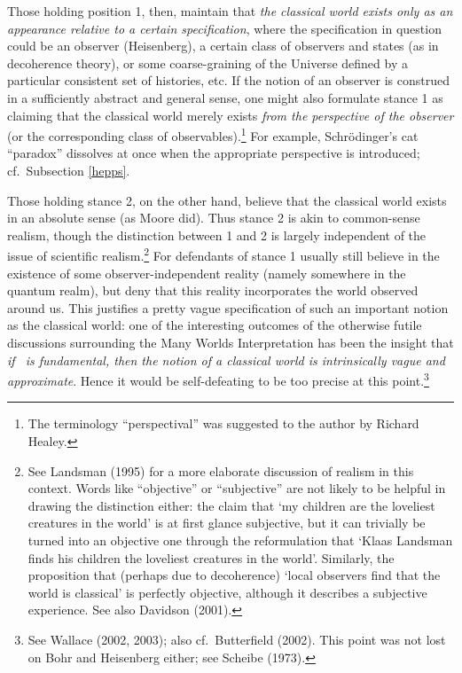 \documentclass[12pt]{article}
\begin{document}
Those holding position 1, then, maintain that {\it the classical world exists only
as an appearance relative to a certain specification}, where the specification in question could be an observer (Heisenberg), a certain class of observers and states (as in decoherence theory), or some  coarse-graining of the Universe defined by a particular consistent set of histories, etc. If the notion of an observer  is construed in a sufficiently abstract and general sense, one might also 
formulate stance 1 as claiming that the classical world merely exists  {\it from the perspective of the observer} (or the corresponding class of observables).\footnote{The  terminology ``perspectival'' was suggested to the author by Richard Healey.}  For example,
 Schr\"{o}dinger's cat ``paradox'' dissolves at once when the appropriate perspective is introduced; cf.\ Subsection \ref{hepps}. 
 
Those holding stance 2, on the other hand,  believe that the classical world exists in an absolute sense (as Moore did). Thus stance 2 is akin to common-sense realism, though the distinction between 1 and 2 is largely independent of the issue of scientific realism.\footnote{See  Landsman (1995) for a more elaborate discussion of 
realism in this context.  Words like ``objective'' or ``subjective'' are not likely to be helpful in drawing the distinction either: the claim that `my children are the loveliest creatures in the world' is at first glance subjective, but it can trivially be turned into an objective one through the reformulation that `Klaas Landsman finds his  children the loveliest creatures in the world'. Similarly, the proposition that 
(perhaps due to decoherence)  `local observers find that the world is classical' is perfectly objective, although it describes a subjective experience. See also Davidson (2001). }
For  defendants of stance 1 usually still believe in the existence of some observer-independent reality (namely somewhere in the quantum realm), but deny that this reality incorporates the world observed around us.  This justifies a pretty vague specification of such an important notion as the classical world: one of the interesting outcomes of the otherwise futile discussions surrounding the Many Worlds Interpretation has been the insight that  {\it if \qm\ is fundamental, then the notion of a classical world is intrinsically vague and approximate}. Hence it would be self-defeating to be too precise at this point.\footnote{See Wallace (2002, 2003); also cf.\ Butterfield (2002). This point was not lost on Bohr and Heisenberg either; see Scheibe (1973).}
\end{document}
